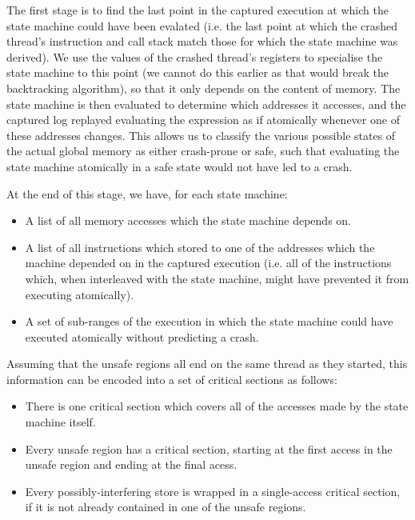 \documentclass[10pt,twocolumn,preprint,natbib,authoryear]{sigplanconf}
\begin{document}
The first stage is to find the last point in the captured execution at
which the state machine could have been evalated (i.e. the last point
at which the crashed thread's instruction and call stack match those
for which the state machine was derived).  We use the values of the
crashed thread's registers to specialise the state machine to this
point (we cannot do this earlier as that would break the backtracking
algorithm), so that it only depends on the content of memory.  The
state machine is then evaluated to determine which addresses it
accesses, and the captured log replayed evaluating the expression as
if atomically whenever one of these addresses changes.  This allows us
to classify the various possible states of the actual global memory as
either crash-prone or safe, such that evaluating the state machine
atomically in a safe state would not have led to a crash.

At the end of this stage, we have, for each state machine:

\begin{itemize}
\item A list of all memory accesses which the state machine depends
  on.
\item A list of all instructions which stored to one of the addresses
  which the machine depended on in the captured execution (i.e. all of
  the instructions which, when interleaved with the state machine,
  might have prevented it from executing atomically).
\item A set of sub-ranges of the execution in which the state machine
  could have executed atomically without predicting a crash.
\end{itemize}

Assuming that the unsafe regions all end on the same thread as they
started, this information can be encoded into a set of critical
sections as follows:

\begin{itemize}
\item There is one critical section which covers all of the accesses
  made by the state machine itself.
\item Every unsafe region has a critical section, starting at the
  first access in the unsafe region and ending at the final acess.
\item Every possibly-interfering store is wrapped in a single-access
  critical section, if it is not already contained in one of the
  unsafe regions.
\end{itemize}
\end{document}
